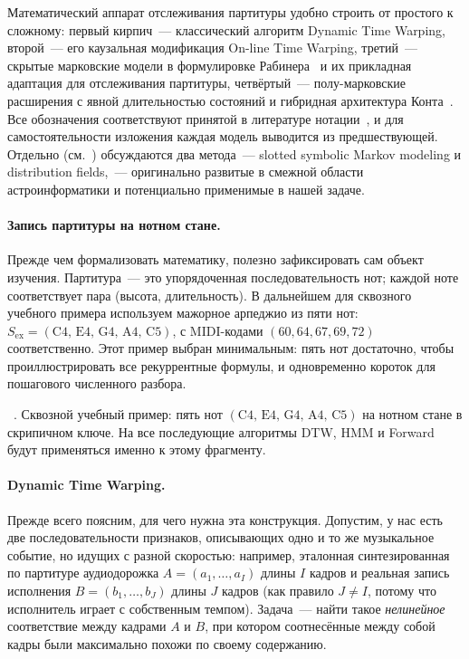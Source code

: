 %
Математический аппарат отслеживания партитуры удобно строить от
простого к сложному: первый кирпич~--- классический алгоритм
Dynamic Time Warping, второй~--- его каузальная модификация
On-line Time Warping, третий~--- скрытые марковские модели в
формулировке Рабинера~\cite{Rabiner1989} и их прикладная
адаптация для отслеживания партитуры, четвёртый~--- полу-марковские
расширения с явной длительностью состояний и гибридная
архитектура Конта~\cite{Cont2010}. Все обозначения соответствуют
принятой в литературе
нотации~\cite{Rabiner1989,Cont2010,Mueller2007}, и для
самостоятельности изложения каждая модель выводится из
предшествующей.
Отдельно (см.~) обсуждаются два метода~---
slotted symbolic Markov modeling и distribution fields,~---
оригинально развитые в смежной области астроинформатики и
потенциально применимые в нашей задаче.

\paragraph*{Запись партитуры на нотном стане.} Прежде чем
формализовать математику, полезно зафиксировать сам объект
изучения. Партитура~--- это упорядоченная последовательность
нот; каждой ноте соответствует пара (высота, длительность).
В дальнейшем для сквозного учебного примера используем мажорное
арпеджио из пяти нот:
$S_{\text{ex}} = (\text{C4, E4, G4, A4, C5})$,
с MIDI-кодами $(60, 64, 67, 69, 72)$ соответственно. Этот
пример выбран минимальным: пять нот достаточно, чтобы
проиллюстрировать все рекуррентные формулы, и одновременно
короток для пошагового численного разбора.

\par\addvspace{2pt}
{\centering
{}%
\par
\vspace{2pt}
\footnotesize
\figurename~\thefigure. Сквозной учебный пример: пять нот
$(\text{C4, E4, G4, A4, C5})$ на нотном стане в скрипичном
ключе. На все последующие алгоритмы DTW, HMM и Forward будут
применяться именно к этому фрагменту.\par}
\addvspace{4pt}

\paragraph*{Dynamic Time Warping.} Прежде всего поясним, для
чего нужна эта конструкция. Допустим, у нас есть две
последовательности признаков, описывающих одно и то же
музыкальное событие, но идущих с разной скоростью: например,
эталонная синтезированная по партитуре аудиодорожка $A =
(a_1, \dots, a_I)$ длины $I$ кадров и реальная запись
исполнения $B = (b_1, \dots, b_J)$ длины $J$ кадров (как
правило $J \ne I$, потому что исполнитель играет с собственным
темпом). Задача~--- найти такое \textit{нелинейное} соответствие
между кадрами $A$ и $B$, при котором соотнесённые между собой
кадры были максимально похожи по своему содержанию.

